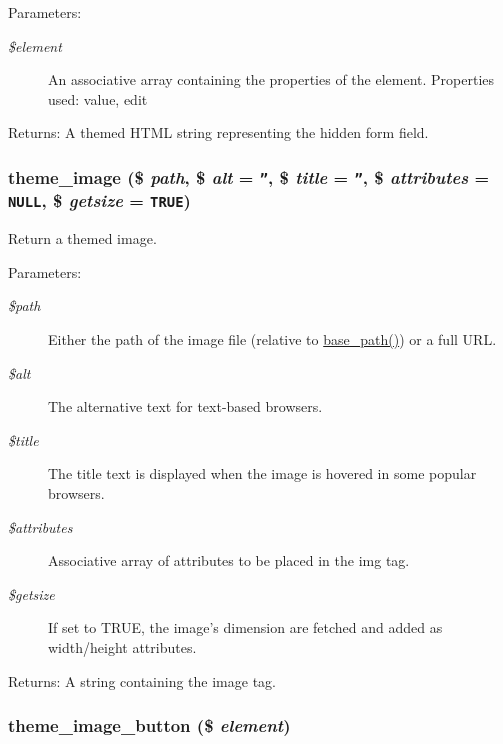 \begin{Desc}
\item[Parameters:]
\begin{description}
\item[{\em \$element}]An associative array containing the properties of the element. Properties used: value, edit \end{description}
\end{Desc}
\begin{Desc}
\item[Returns:]A themed HTML string representing the hidden form field. \end{Desc}
\hypertarget{group__themeable_g035987a258a89e8f1ea7e9ee0f64369b}{
\subsubsection[{theme\_\-image}]{\setlength{\rightskip}{0pt plus 5cm}theme\_\-image (\$ {\em path}, \/  \$ {\em alt} = {\tt ''}, \/  \$ {\em title} = {\tt ''}, \/  \$ {\em attributes} = {\tt NULL}, \/  \$ {\em getsize} = {\tt TRUE})}}
\label{group__themeable_g035987a258a89e8f1ea7e9ee0f64369b}


Return a themed image.

\begin{Desc}
\item[Parameters:]
\begin{description}
\item[{\em \$path}]Either the path of the image file (relative to \hyperlink{common_8inc_e227697e9c239f09fd7e36f71afde771}{base\_\-path()}) or a full URL. \item[{\em \$alt}]The alternative text for text-based browsers. \item[{\em \$title}]The title text is displayed when the image is hovered in some popular browsers. \item[{\em \$attributes}]Associative array of attributes to be placed in the img tag. \item[{\em \$getsize}]If set to TRUE, the image's dimension are fetched and added as width/height attributes. \end{description}
\end{Desc}
\begin{Desc}
\item[Returns:]A string containing the image tag. \end{Desc}
\hypertarget{group__themeable_gef0c290973d09b09d2d991547877be20}{
\subsubsection[{theme\_\-image\_\-button}]{\setlength{\rightskip}{0pt plus 5cm}theme\_\-image\_\-button (\$ {\em element})}}
\label{group__themeable_gef0c290973d09b09d2d991547877be20}


